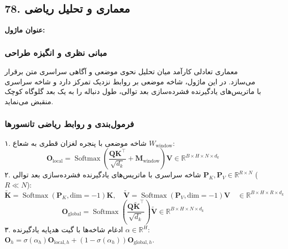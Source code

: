 \subsection*{78. معماری و تحلیل ریاضی }
\textbf{عنوان ماژول:} 

\subsubsection*{مبانی نظری و انگیزه طراحی}
معماری  تعادلی کارآمد میان تحلیل نحوی موضعی و آگاهی سراسری متن برقرار می‌سازد. در این ماژول، شاخه موضعی بر روابط نزدیک تمرکز دارد و شاخه سراسری با ماتریس‌های یادگیرنده فشرده‌سازی بعد توالی، طول دنباله را به یک بعد گلوگاه کوچک منقبض می‌نماید.

\subsubsection*{فرمول‌بندی و روابط ریاضی تانسورها}
۱. شاخه موضعی با پنجره لغزان قطری به شعاع $W_{\text{window}}$:
\begin{equation}
\mathbf{O}_{\text{local}} = \operatorname{Softmax}\left(\frac{\mathbf{Q} \mathbf{K}^\top}{\sqrt{d_k}} + \mathbf{M}_{\text{window}}\right) \mathbf{V} \in \mathbb{R}^{B \times H \times N \times d_k}
\end{equation}
۲. شاخه سراسری با ماتریس‌های یادگیرنده فشرده‌سازی بعد توالی $\mathbf{P}_K, \mathbf{P}_V \in \mathbb{R}^{R \times N}$ ($R \ll N$):
\begin{equation}
\widetilde{\mathbf{K}} = \operatorname{Softmax}(\mathbf{P}_K, \text{dim}=-1) \mathbf{K}, \quad \widetilde{\mathbf{V}} = \operatorname{Softmax}(\mathbf{P}_V, \text{dim}=-1) \mathbf{V} \quad \in \mathbb{R}^{B \times H \times R \times d_k}
\end{equation}
\begin{equation}
\mathbf{O}_{\text{global}} = \operatorname{Softmax}\left(\frac{\mathbf{Q} \widetilde{\mathbf{K}}^\top}{\sqrt{d_k}}\right) \widetilde{\mathbf{V}} \in \mathbb{R}^{B \times H \times N \times d_k}
\end{equation}
۳. ادغام شاخه‌ها با گیت هدپایه یادگیرنده $\alpha \in \mathbb{R}^H$: $\mathbf{O}_h = \sigma(\alpha_h) \mathbf{O}_{\text{local}, h} + (1 - \sigma(\alpha_h)) \mathbf{O}_{\text{global}, h}$.

